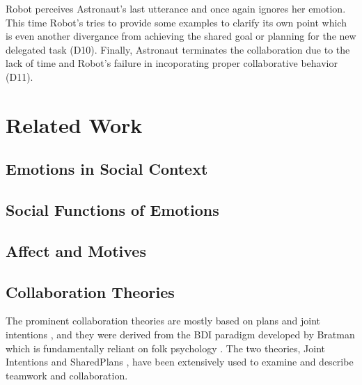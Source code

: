 Robot perceives Astronaut's last utterance and once again ignores her emotion.
This time Robot's tries to provide some examples to clarify its own point
which is even another divergance from achieving the shared goal or planning
for the new delegated task (D10). Finally, Astronaut terminates the
collaboration due to the lack of time and Robot's failure in incoporating
proper collaborative behavior (D11).\\

\noindent{}

\section{Related Work}
\label{sec:related-work}

\subsection{Emotions in Social Context}

\subsection{Social Functions of Emotions}

\subsection{Affect and Motives}

\subsection{Collaboration Theories}
\label{sec:collaboration-theories}

The prominent collaboration theories are mostly based on plans and joint
intentions
\cite{cohen:teamwork,grosz:plans-discourse,Litman:discourse-commonsense}, and
they were derived from the BDI paradigm developed by Bratman
\cite{bratman:intentions-plans} which is fundamentally reliant on folk
psychology \cite{ravenscroft:folk}. The two theories, Joint Intentions
\cite{cohen:teamwork} and SharedPlans \cite{grosz:plans-discourse}, have been
extensively used to examine and describe teamwork and collaboration.

